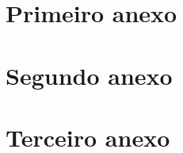 \documentclass[12pt,openright,twoside,a4paper]{abntex2}
\begin{document}
\begin{anexosenv}
% 

\appendixpage

\chapter{Primeiro anexo}
\lipsum[200-202]

\chapter{Segundo anexo}

\lipsum[210-212]

\chapter{Terceiro anexo}

\lipsum[213-214]

\end{anexosenv}



\printindex
\end{document}
